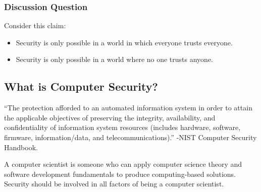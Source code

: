 \documentclass{math}
\begin{document}
\subsubsection*{Discussion Question}
Consider this claim:
\begin{itemize}
  \item Security is only possible in a world in which everyone trusts everyone.
  \item Security is only possible in a world where no one trusts anyone.
\end{itemize}

\subsection*{What is Computer Security?}
``The protection afforded to an automated information system in order to attain
the applicable objectives of preserving the integrity, availability, and
confidentiality of information system resources (includes hardware, software,
firmware, information/data, and telecommunications).'' -NIST Computer Security
Handbook.
\par A computer scientist is someone who can apply computer science theory and
software development fundamentals to produce computing-based solutions.
Security should be involved in all factors of being a computer scientist.

\clearpage
\end{document}
